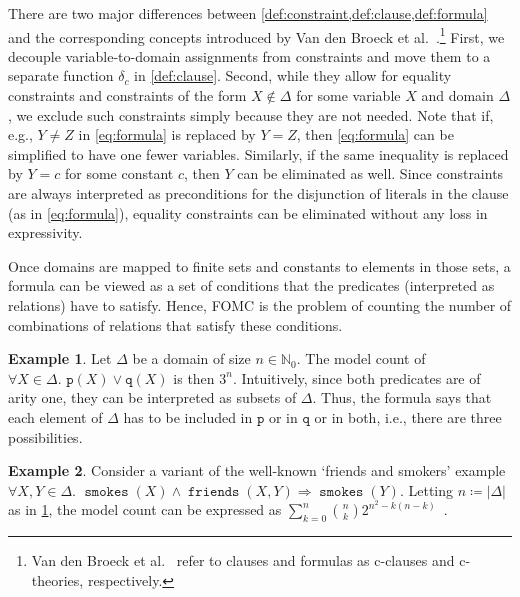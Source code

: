 \documentclass{article}
\theoremstyle{definition}
\newtheorem{example}{Example}
\theoremstyle{remark}
\DeclareMathOperator{\friends}{\texttt{friends}}
\DeclareMathOperator{\smokes}{\texttt{smokes}}
\begin{document}
There are two major differences between
\cref{def:constraint,def:clause,def:formula} and the corresponding concepts
introduced by Van den Broeck et
al.~.\footnote{Van den Broeck et
  al.~ refer to clauses and formulas as
  c-clauses and c-theories, respectively.} First, we decouple variable-to-domain
assignments from constraints and move them to a separate function $\delta_{c}$
in \cref{def:clause}. Second, while they allow for equality constraints and
constraints of the form $X \not\in \Delta$ for some variable $X$ and domain
$\Delta$, we exclude such constraints simply because they are not needed. Note
that if, e.g., $Y \ne Z$ in \cref{eq:formula} is replaced by $Y = Z$, then
\cref{eq:formula} can be simplified to have one fewer variables. Similarly, if
the same inequality is replaced by $Y = c$ for some constant $c$, then $Y$ can
be eliminated as well. Since constraints are always interpreted as preconditions
for the disjunction of literals in the clause (as in \cref{eq:formula}),
equality constraints can be eliminated without any loss in expressivity.

Once domains are mapped to finite sets and constants to elements in those sets,
a formula can be viewed as a set of conditions that the predicates (interpreted
as relations) have to satisfy. Hence, FOMC is the problem of counting the number
of combinations of relations that satisfy these conditions.

\begin{example}\label{example:simple}
  Let $\Delta$ be a domain of size $n \in \mathbb{N}_{0}$. The model count of
  $\forall X \in \Delta\text{. } \texttt{p}(X) \lor \texttt{q}(X)$ is then
  $3^{n}$. Intuitively, since both predicates are of arity one, they can be
  interpreted as subsets of $\Delta$. Thus, the formula says that each element
  of $\Delta$ has to be included in $\texttt{p}$ or in $\texttt{q}$ or in both,
  i.e., there are three possibilities.
\end{example}

\begin{example}\label{example:smokers}
  Consider a variant of the well-known `friends and smokers' example
  $\forall X, Y \in \Delta\text{.
  } \smokes(X) \land \friends(X, Y) \Rightarrow \smokes(Y)$. Letting
  $n \coloneqq |\Delta|$ as in \cref{example:simple}, the model count can be
  expressed as
  $\sum_{k=0}^{n} \binom{n}{k}2^{n^{2} - k(n-k)}$~\cite{DBLP:conf/kr/BroeckMD14}.
\end{example}
\end{document}
